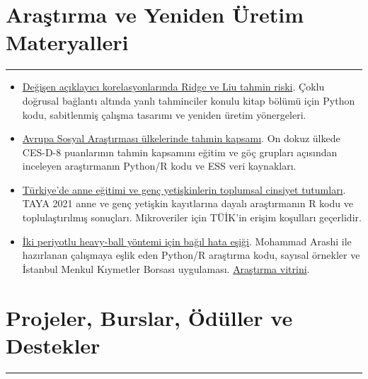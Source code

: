 \documentclass[10pt,a4paper]{article}
\newcommand{\NewPart}[2]{%
	\Needspace{7\baselineskip}%
	\vspace{0.45em}%
	\section*{\sffamily\large\bfseries\color{MidnightBlue}#1 #2}%
	\vspace{-0.7em}\noindent\color{MidnightBlue}\rule{\textwidth}{0.55pt}\color{Black}\vspace{0.25em}}
\begin{document}
\NewPart{Araştırma ve Yeniden Üretim Materyalleri}{}
\begin{itemize}
\item \href{https://github.com/byuzbasi/ridge-liu-correlation-risk}{Değişen açıklayıcı korelasyonlarında Ridge ve Liu tahmin riski}. Çoklu doğrusal bağlantı altında yanlı tahminciler konulu kitap bölümü için Python kodu, sabitlenmiş çalışma tasarımı ve yeniden üretim yönergeleri.
\item \href{https://github.com/byuzbasi/ess-selective-prediction}{Avrupa Sosyal Araştırması ülkelerinde tahmin kapsamı}. On dokuz ülkede CES-D-8 puanlarının tahmin kapsamını eğitim ve göç grupları açısından inceleyen araştırmanın Python/R kodu ve ESS veri kaynakları.
\item \href{https://github.com/byuzbasi/taya-maternal-education}{Türkiye'de anne eğitimi ve genç yetişkinlerin toplumsal cinsiyet tutumları}. TAYA 2021 anne ve genç yetişkin kayıtlarına dayalı araştırmanın R kodu ve toplulaştırılmış sonuçları. Mikroveriler için TÜİK'in erişim koşulları geçerlidir.
\item \href{https://github.com/byuzbasi/periodic-momentum}{İki periyotlu heavy-ball yöntemi için bağıl hata eşiği}. Mohammad Arashi ile hazırlanan çalışmaya eşlik eden Python/R araştırma kodu, sayısal örnekler ve İstanbul Menkul Kıymetler Borsası uygulaması. \href{https://byuzbasi.github.io/periodic-momentum/}{Araştırma vitrini}.
\end{itemize}

\NewPart{Projeler, Burslar, Ödüller ve Destekler}{}
\end{document}
